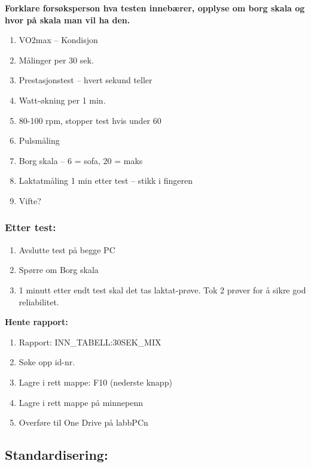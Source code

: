 \documentclass[
  letterpaper,
  DIV=11,
  numbers=noendperiod]{scrreprt}
\providecommand{\tightlist}{%
  \setlength{\itemsep}{0pt}\setlength{\parskip}{0pt}}\usepackage{longtable,booktabs,array}
\begin{document}
\textbf{Forklare forsøksperson hva testen innebærer, opplyse om borg
skala og hvor på skala man vil ha den.}

\begin{enumerate}
\def\labelenumi{\arabic{enumi}.}
\tightlist
\item
  VO2max -- Kondisjon
\item
  Målinger per 30 sek.
\item
  Prestasjonstest -- hvert sekund teller
\item
  Watt-økning per 1 min.
\item
  80-100 rpm, stopper test hvis under 60
\item
  Pulsmåling
\item
  Borg skala -- 6 = sofa, 20 = maks
\item
  Laktatmåling 1 min etter test -- stikk i fingeren
\item
  Vifte?
\end{enumerate}

\subsubsection{Etter test:}\label{etter-test}

\begin{enumerate}
\def\labelenumi{\arabic{enumi}.}
\tightlist
\item
  Avslutte test på begge PC
\item
  Spørre om Borg skala
\item
  1 minutt etter endt test skal det tas laktat-prøve. Tok 2 prøver for å
  sikre god reliabilitet.
\end{enumerate}

\textbf{Hente rapport:}

\begin{enumerate}
\def\labelenumi{\arabic{enumi}.}
\tightlist
\item
  Rapport: INN\_TABELL:30SEK\_MIX
\item
  Søke opp id-nr.
\item
  Lagre i rett mappe: F10 (nederste knapp)
\item
  Lagre i rett mappe på minnepenn
\item
  Overføre til One Drive på labbPCn
\end{enumerate}

\subsection{Standardisering:}\label{standardisering}
\end{document}
